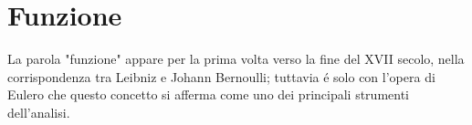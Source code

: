 \section{Funzione}
La parola "funzione" appare per la prima volta verso la fine del XVII secolo, nella corrispondenza tra Leibniz e Johann Bernoulli; tuttavia \'{e} solo con l'opera di Eulero
che questo concetto si afferma come uno dei principali strumenti dell'analisi.
